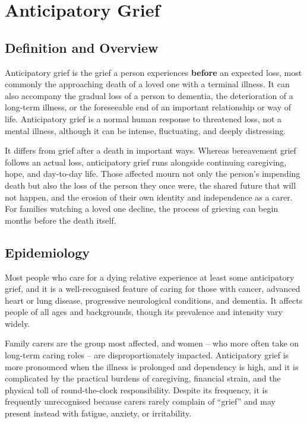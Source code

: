 \chapter{Anticipatory Grief}

\section*{Definition and Overview}
Anticipatory grief is the grief a person experiences \textbf{before} an expected loss, most commonly the approaching death of a loved one with a terminal illness. It can also accompany the gradual loss of a person to dementia, the deterioration of a long-term illness, or the foreseeable end of an important relationship or way of life. Anticipatory grief is a normal human response to threatened loss, not a mental illness, although it can be intense, fluctuating, and deeply distressing.

It differs from grief after a death in important ways. Whereas bereavement grief follows an actual loss, anticipatory grief runs alongside continuing caregiving, hope, and day-to-day life. Those affected mourn not only the person's impending death but also the loss of the person they once were, the shared future that will not happen, and the erosion of their own identity and independence as a carer. For families watching a loved one decline, the process of grieving can begin months before the death itself.

\section*{Epidemiology}
Most people who care for a dying relative experience at least some anticipatory grief, and it is a well-recognised feature of caring for those with cancer, advanced heart or lung disease, progressive neurological conditions, and dementia. It affects people of all ages and backgrounds, though its prevalence and intensity vary widely.

Family carers are the group most affected, and women -- who more often take on long-term caring roles -- are disproportionately impacted. Anticipatory grief is more pronounced when the illness is prolonged and dependency is high, and it is complicated by the practical burdens of caregiving, financial strain, and the physical toll of round-the-clock responsibility. Despite its frequency, it is frequently unrecognised because carers rarely complain of ``grief'' and may present instead with fatigue, anxiety, or irritability.

